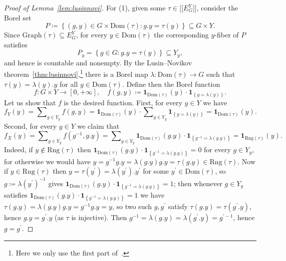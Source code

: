 \documentclass{amsart}
\numberwithin{equation}{subsection}
\theoremstyle{remark}
\begin{document}
\begin{proof}[Proof of Lemma~\ref{lem:lusinnovi}]
For (1), given some \(\tau\in\bigl[\!\bigl[E_{G}^{Y}\bigr]\!\bigr]\), consider the Borel set
\[P\coloneqq\left\{ \left(g,y\right)\in G\times\mathrm{Dom}\left(\tau\right):g.y=\tau\left(y\right)\right\} \subseteq G\times Y.\]
Since \(\mathrm{Graph}\left(\tau\right)\subseteq E_{G}^{Y}\), for every \(y\in\mathrm{Dom}\left(\tau\right)\) the corresponding \(y\)-fiber of \(P\) satisfies
\[P_{y}=\left\{ g\in G:g.y=\tau\left(y\right)\right\} \subseteq Y_{y},\]
and hence is countable and nonempty. By the Lusin--Novikov theorem~\ref{thm:lusinnovi},\footnote{Here we only use the first part of~\cite[Theorem (18.10)]{kechris2012classical}.} there is a Borel map \(\lambda:\mathrm{Dom}\left(\tau\right)\to G\) such that
\(\tau\left(y\right)=\lambda\left(y\right).y\) for all \(y\in\mathrm{Dom}\left(\tau\right)\). Define then the Borel function
\[f:G\times Y\longrightarrow\left[0,+\infty\right],\quad f\left(g,y\right)\coloneqq\mathbf{1}_{\mathrm{Dom}\left(\tau\right)}\left(y\right)\cdot\mathbf{1}_{\left\{g=\lambda\left(y\right)\right\}}.\]
Let us show that \(f\) is the desired function. First, for every \(y\in Y\) we have
\[f_{Y}\left(y\right)=\sum\nolimits_{g\in Y_{y}}f\left(g,y\right)=\mathbf{1}_{\mathrm{Dom}\left(\tau\right)}\left(y\right)\cdot\sum\nolimits_{g\in Y_{y}}\mathbf{1}_{\left\{g=\lambda\left(y\right)\right\}}=\mathbf{1}_{\mathrm{Dom}\left(\tau\right)}\left(y\right).\]
Second, for every \(y\in Y\) we claim that
\[f_{X}\left(y\right)=\sum\nolimits_{g\in Y_{y}}f\left(g^{-1},g.y\right)=\sum\nolimits_{g\in Y_{y}}\mathbf{1}_{\mathrm{Dom}\left(\tau\right)}\left(g.y\right)\cdot\mathbf{1}_{\left\{g^{-1}=\lambda\left(g.y\right)\right\}}=\mathbf{1}_{\mathrm{Rng}\left(\tau\right)}\left(y\right).\]
Indeed, if \(y\notin\mathrm{Rng}\left(\tau\right)\) then \(\mathbf{1}_{\mathrm{Dom}\left(\tau\right)}\left(g.y\right)\cdot\mathbf{1}_{\left\{ g^{-1}=\lambda\left(g.y\right)\right\} }=0\) for every \(g\in Y_{y}\), for otherwise we would have \(y=g^{-1}g.y=\lambda\left(g.y\right)g.y=\tau\left(g.y\right)\in\mathrm{Rng}\left(\tau\right)\). Now if \(y\in\mathrm{Rng}\left(\tau\right)\) then \(y=\tau\left(y^{\prime}\right)=\lambda\left(y^{\prime}\right).y^{\prime}\) for some \(y^{\prime}\in\mathrm{Dom}\left(\tau\right)\), so \(g\coloneqq \lambda\left(y^{\prime}\right)^{-1}\) gives \(\mathbf{1}_{\mathrm{Dom}\left(\tau\right)}\left(g.y\right)\cdot\mathbf{1}_{\left\{g^{-1}=\lambda\left(g.y\right)\right\}}=1\); then whenever \(g\in Y_{y}\) satisfies \(\mathbf{1}_{\mathrm{Dom}\left(\tau\right)}\left(g.y\right)\cdot\mathbf{1}_{\left\{g^{-1}=\lambda\left(g.y\right)\right\}}=1\) we have \(\tau\left(g.y\right)=\lambda\left(g.y\right)g.y=g^{-1}g.y=y\), so two such \(g,g^{\prime}\) satisfy \(\tau\left(g.y\right)=\tau\left(g^{\prime}.y\right)\), hence \(g.y=g^{\prime}.y\) (as \(\tau\) is injective). Then \(g^{-1}=\lambda\left(g.y\right)=\lambda\left(g^{\prime}.y\right)=g^{\prime-1}\), hence \(g=g^{\prime}\).


\end{proof}
\end{document}
